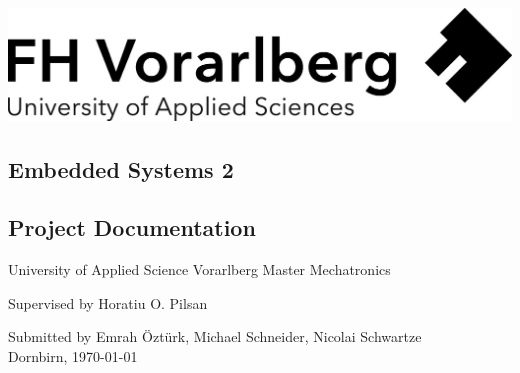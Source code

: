 \documentclass[a4paper,12pt,twoside]{scrreprt}
\begin{document}
\cleardoublepage   %
\thispagestyle{empty}
\begin{titlepage}
  \begin{flushright}
  \includegraphics[width=0.4\linewidth]{Logo-A3}
  \end{flushright}
  \begin{flushleft}
  \section*{Embedded Systems 2}
  \subsection*{Project Documentation}
  \vspace{1cm}
  \vspace{1cm}

  \vspace{1cm}
  University of Applied Science Vorarlberg\newline
  Master Mechatronics

  \vspace{2cm}
  
  Supervised by \newline
  Horatiu O. Pilsan
  
  \vspace{2cm}
  
  Submitted by\newline
  Emrah Öztürk, \newline
  Michael Schneider, \newline
  Nicolai Schwartze\newline
  \\
  Dornbirn, \today
  \end{flushleft}
\end{titlepage}



\thispagestyle{empty}
\cleardoublepage   %
\tableofcontents

\thispagestyle{empty}
\fancyfoot[C]{\thepage}%
\clearpage
{}
{}
\listoffigures



\end{document}
